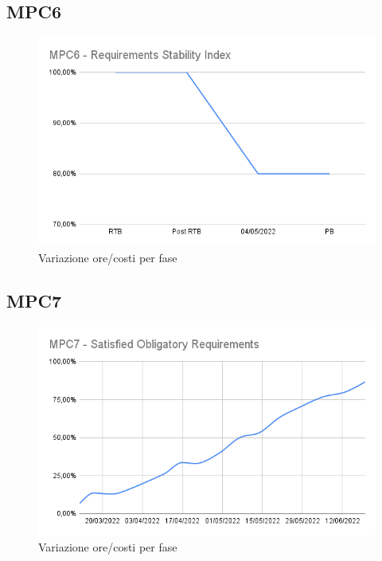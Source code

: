 \subsection{MPC6}
\begin{figure}[H]
    \centering
    \includegraphics[scale=0.65]{../../assets/MPC6 - Requirements Stability Index.png}
    \caption{Variazione ore/costi per fase}
\end{figure}
\subsection{MPC7}
\begin{figure}[H]
    \centering
    \includegraphics[scale=0.65]{../../assets/MPC7 - Satisfied Obligatory Requirements.png}
    \caption{Variazione ore/costi per fase}
\end{figure}
